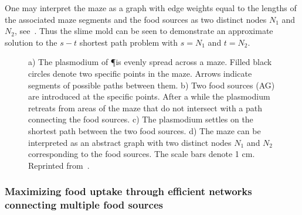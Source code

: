 			One may interpret the maze as a graph with edge weights equal to the lengths of the associated maze segments and the food sources as two distinct nodes $N_1$ and $N_2$, see~. Thus the slime mold \Pp can be seen to demonstrate an approximate solution to the $s-t$ shortest path problem with $s=N_1$ and $t=N_2$.

			\begin{figure}
				\centering
				\newline
				
				\caption[Classic maze experiment with \P]{ a) The plasmodium of 
				\P is evenly spread across a maze. Filled black circles denote two specific points in the maze. Arrows indicate segments of possible paths between them. b) Two food sources (AG) are introduced at the specific points. After a while the plasmodium retreats from areas of the maze that do not intersect with a path connecting the food sources. c) The plasmodium settles on the shortest path between the two food sources. d) The maze can be interpreted as an abstract graph with two distinct nodes $N_1$ and $N_2$ corresponding to the food sources. The scale bars denote 1 cm. Reprinted from~\cite{Tero2007553}.}
				\label{fig:maze}
			\end{figure}


		\subsubsection{Maximizing food uptake through efficient networks connecting multiple food sources}

